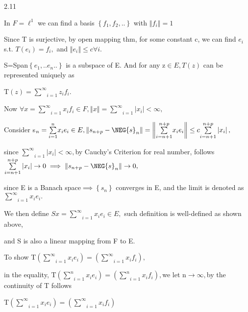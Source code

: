 \documentclass{article}
\begin{document}
2.11

\bigskip In $F=\ell ^{1}$ we can find a basis $\left\{
f_{1},f_{2},..\right\} $ with $\left\Vert f_{i}\right\Vert =1$

Since T is surjective, by open mapping thm, for some constant c, we can find 
$e_{i}$ s.t. $T\left( e_{i}\right) =f_{i},$ and $\left\Vert e_{i}\right\Vert
\leq c\forall i.$ 

S=Span$\left\{ e_{1},..e_{n}..\right\} $ is a subspace of E. And for any z$%
\in E,T\left( z\right) $ can be represented uniquely as 

T$\left( z\right) =\underset{i=1}{\overset{\infty }{\sum }}z_{i}f_{i}.$

Now $\forall x=\underset{i=1}{\overset{\infty }{\sum }}x_{i}f_{i}\in
F,\left\Vert x\right\Vert =\underset{i=1}{\overset{\infty }{\sum }}%
\left\vert x_{i}\right\vert <\infty ,$

\bigskip Consider s$_{n}=\underset{i=1}{\overset{n}{\sum }}x_{i}e_{i}\in
E,\left\Vert s_{n+p}-\NEG{s}_{n}\right\Vert =\left\Vert \underset{i=n+1}{%
\overset{n+p}{\sum }}x_{i}e_{i}\right\Vert \leq c\underset{i=n+1}{\overset{%
n+p}{\sum }}\left\vert x_{i}\right\vert ,$

since $\underset{i=1}{\overset{\infty }{\sum }}\left\vert x_{i}\right\vert
<\infty ,$by Cauchy's Criterion for real number, follows $\underset{i=n+1}{%
\overset{n+p}{\sum }}\left\vert x_{i}\right\vert \rightarrow 0\implies
\left\Vert s_{n+p}-\NEG{s}_{n}\right\Vert \rightarrow 0,$

since E is a Banach space$\implies \left\{ s_{n}\right\} $ converges in E,
and the limit is denoted as $\underset{i=1}{\overset{\infty }{\sum }}%
x_{i}e_{i}.$

We then define $Sx=\underset{i=1}{\overset{\infty }{\sum }}x_{i}e_{i}\in E,$%
such definition is well-defined as shown above,

and S is also a linear mapping from F to E. 

\bigskip To show T$\left( \underset{i=1}{\overset{\infty }{\sum }}%
x_{i}e_{i}\right) =\left( \underset{i=1}{\overset{\infty }{\sum }}%
x_{i}f_{i}\right) ,$

in the equality, T$\left( \underset{i=1}{\overset{n}{\sum }}%
x_{i}e_{i}\right) =\left( \underset{i=1}{\overset{n}{\sum }}%
x_{i}f_{i}\right) ,$we let n$\rightarrow \infty ,$by the continuity of T
follows 

T$\left( \underset{i=1}{\overset{\infty }{\sum }}x_{i}e_{i}\right) =\left( 
\underset{i=1}{\overset{\infty }{\sum }}x_{i}f_{i}\right) $
\end{document}
